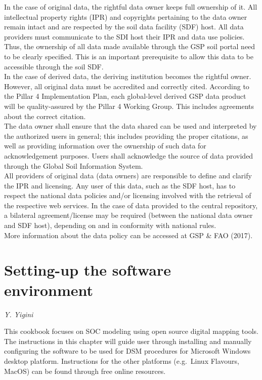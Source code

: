 \documentclass[
  10pt,
  b5paper,
  oneside]{book}
\theoremstyle{definition}
\theoremstyle{definition}
\theoremstyle{definition}
\theoremstyle{definition}
\theoremstyle{remark}
\begin{document}
In the case of original data, the rightful data owner keeps full
ownership of it. All intellectual property rights (IPR) and copyrights
pertaining to the data owner remain intact and are respected by the soil
data facility (SDF) host. All data providers must communicate to the SDI
host their IPR and data use policies. Thus, the ownership of all data
made available through the GSP soil portal need to be clearly specified.
This is an important prerequisite to allow this data to be accessible
through the soil SDF.\\
In the case of derived data, the deriving institution becomes the
rightful owner. However, all original data must be accredited and
correctly cited. According to the Pillar 4 Implementation Plan, each
global-level derived GSP data product will be quality-assured by the
Pillar 4 Working Group. This includes agreements about the correct
citation.\\
The data owner shall ensure that the data shared can be used and
interpreted by the authorized users in general; this includes providing
the proper citations, as well as providing information over the
ownership of such data for acknowledgement purposes. Users shall
acknowledge the source of data provided through the Global Soil
Information System.\\
All providers of original data (data owners) are responsible to define
and clarify the IPR and licensing. Any user of this data, such as the
SDF host, has to respect the national data policies and/or licensing
involved with the retrieval of the respective web services. In the case
of data provided to the central repository, a bilateral
agreement/license may be required (between the national data owner and
SDF host), depending on and in conformity with national rules.\\
More information about the data policy can be accessed at GSP \& FAO (2017).

\hypertarget{setting-up-the-software-environment}{%
\chapter{Setting-up the software environment}\label{setting-up-the-software-environment}}

\emph{Y. Yigini}

This cookbook focuses on SOC modeling using open source digital mapping tools. The instructions in this chapter will guide user through installing and manually configuring the software to be used for DSM procedures for Microsoft Windows desktop platform. Instructions for the other platforms (e.g.~Linux Flavours, MacOS) can be found through free online resources.
\end{document}
